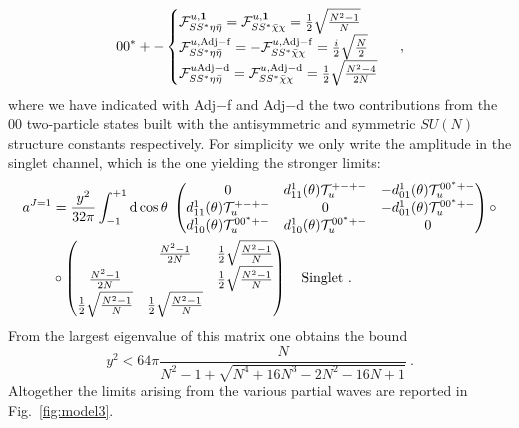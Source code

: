 \documentclass[a4paper,11pt]{article}
\newcommand{\be}{\begin{equation}}
\newcommand{\ee}{\end{equation}}
\newcommand{\nn}{\nonumber}
\begin{document}
\begin{align}\label{eq:group_model3_J1_complex}
00^*+-
\begin{cases}
 {\cal F}^{u, \bf{1}}_{S S^*\eta\bar\eta } =  {\cal F}^{u, \bf{1}}_{S S^*\bar\chi \chi}  =   \frac{1}{2}\sqrt{\frac{N^2-1}{N}} \\
 {\cal F}^{u, \rm{Adj-f}}_{S S^*\eta\bar\eta } = - {\cal F}^{u, \rm{Adj-f}}_{S S^*\bar\chi \chi }  = \frac{i}{2} \sqrt{\frac{N}{2}}  \\
%
  {\cal F}^{u \rm{Adj-d}}_{S S^*\eta\bar\eta } =  {\cal F}^{u, \rm{Adj-d}}_{S S^*\bar\chi \chi }  =  \frac{1}{2}\sqrt{\frac{N^2-4}{2N}}  \\
\end{cases} \ ,
\end{align}
where we have indicated with Adj$-$f and Adj$-$d the two contributions from the $00$ two-particle states built with the antisymmetric and symmetric $SU(N)$ structure constants respectively. For simplicity we only write the amplitude in the singlet channel, which is the one yielding the stronger limits:
\begin{align}\label{eq:model3_j1complex_sing}
a^{J=1}& =\frac{y^2}{32\pi} \int_{-1}^{+1}{\rm d}\cos\theta \; 
\begin{pmatrix}
0 & d^{1}_{11}(\theta) {\cal T}_u^{+-+-} & -d^{1}_{01}(\theta){\cal T}_u^{00^*+-} \\
d^{1}_{11}(\theta) {\cal T}_u^{+-+-} & 0 & -d^{1}_{01}(\theta){\cal T}_u^{00^*+-}  \\
d^{1}_{10}(\theta){\cal T}_u^{00^*+-} & d^{1}_{10}(\theta){\cal T}_u^{00^*+-}& 0
\end{pmatrix}\circ \nn \\
& \circ
\begin{pmatrix}
 & \frac{N^2-1}{2N}  & \frac{1}{2}\sqrt{\frac{N^2-1}{N}}\\
\frac{N^2-1}{2N}  &  &\frac{1}{2}\sqrt{\frac{N^2-1}{N}}\\
\frac{1}{2}\sqrt{\frac{N^2-1}{N}}&\frac{1}{2}\sqrt{\frac{N^2-1}{N}} & 
\end{pmatrix} \quad {\rm Singlet}
\ .
\end{align}
From the largest eigenvalue of this matrix one obtains the bound
\be
y^2 < 64\pi \frac{N}{N^2-1 +\sqrt{N^4+16 N^3-2N^2-16N+1}} \ .
\ee
Altogether the limits arising from the various partial waves are reported in Fig.~\ref{fig:model3}.
\end{document}
